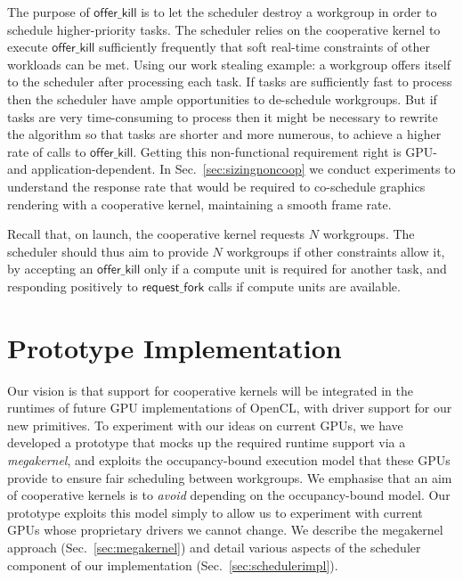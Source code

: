 \documentclass[parskip=half,sigconf,review, anonymous=true, acmcopyrightmode=none]{acmart}
\makeatletter
\renewcommand\paragraph{\@startsection{paragraph}{4}{\z@}%
  {-.5\baselineskip \@plus -2\p@ \@minus -.2\p@}%
  {-3.5\p@}%
  {\bfseries\@parfont}}
\newcommand{\mysec}{Sec.~}
\newcommand{\offerfork}{\mathsf{request\_fork}}
\newcommand{\offerkill}{\mathsf{offer\_kill}}
\makeatother
\begin{document}
The purpose of $\offerkill$ is to let the scheduler destroy a workgroup
in order to schedule higher-priority tasks.  The scheduler relies on the
cooperative kernel to execute $\offerkill$ sufficiently frequently that
soft real-time constraints of other workloads can be met.
%
Using our work stealing example: a workgroup offers itself to
the scheduler after processing each task.  If tasks are sufficiently
fast to process then the scheduler have ample opportunities to
de-schedule workgroups.  But if tasks are very time-consuming to
process then it might be necessary to rewrite the algorithm so that
tasks are shorter and more numerous, to achieve a higher rate of calls
to $\offerkill$.
%
Getting this non-functional requirement right is GPU- and
application-dependent.  In \mysec\ref{sec:sizingnoncoop} we conduct
experiments to understand the response rate that would be required to
co-schedule graphics rendering with a cooperative kernel, maintaining
a smooth frame rate.


Recall that, on launch, the cooperative kernel requests $N$ workgroups.
The scheduler should thus aim to provide $N$ workgroups if other constraints allow it,
by accepting an $\offerkill$ only if a compute unit is required for another
task, and responding positively to $\offerfork$ calls if compute units are available.





\section{Prototype Implementation}\label{sec:implementation}

Our vision is that support for cooperative kernels will be integrated
in the runtimes of future GPU implementations of OpenCL, with driver
support for our new primitives.  To experiment with our ideas on
current GPUs, we have developed a prototype that mocks up the required
runtime support via a \emph{megakernel}, and exploits the
occupancy-bound execution model that these GPUs provide to ensure fair
scheduling between workgroups.  We emphasise that an aim of
cooperative kernels is to \emph{avoid} depending on the
occupancy-bound model.  Our prototype exploits this model simply to
allow us to experiment with current GPUs whose proprietary drivers we
cannot change.  We describe the megakernel approach
(\mysec\ref{sec:megakernel}) and detail various aspects of the
scheduler component of our implementation
(\mysec\ref{sec:schedulerimpl}).
\end{document}
